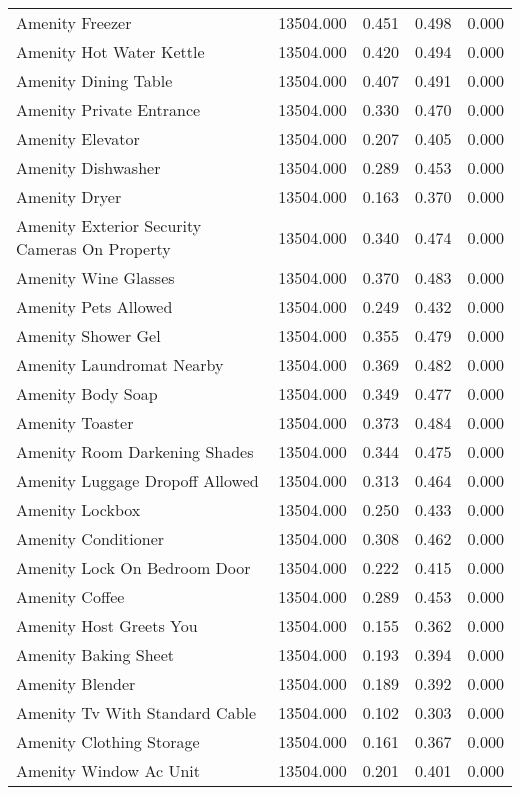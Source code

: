 \begin{tabular}{lllll}
Amenity Freezer & 13504.000 & 0.451 & 0.498 & 0.000 \\
Amenity Hot Water Kettle & 13504.000 & 0.420 & 0.494 & 0.000 \\
Amenity Dining Table & 13504.000 & 0.407 & 0.491 & 0.000 \\
Amenity Private Entrance & 13504.000 & 0.330 & 0.470 & 0.000 \\
Amenity Elevator & 13504.000 & 0.207 & 0.405 & 0.000 \\
Amenity Dishwasher & 13504.000 & 0.289 & 0.453 & 0.000 \\
Amenity Dryer & 13504.000 & 0.163 & 0.370 & 0.000 \\
Amenity Exterior Security Cameras On Property & 13504.000 & 0.340 & 0.474 & 0.000 \\
Amenity Wine Glasses & 13504.000 & 0.370 & 0.483 & 0.000 \\
Amenity Pets Allowed & 13504.000 & 0.249 & 0.432 & 0.000 \\
Amenity Shower Gel & 13504.000 & 0.355 & 0.479 & 0.000 \\
Amenity Laundromat Nearby & 13504.000 & 0.369 & 0.482 & 0.000 \\
Amenity Body Soap & 13504.000 & 0.349 & 0.477 & 0.000 \\
Amenity Toaster & 13504.000 & 0.373 & 0.484 & 0.000 \\
Amenity Room Darkening Shades & 13504.000 & 0.344 & 0.475 & 0.000 \\
Amenity Luggage Dropoff Allowed & 13504.000 & 0.313 & 0.464 & 0.000 \\
Amenity Lockbox & 13504.000 & 0.250 & 0.433 & 0.000 \\
Amenity Conditioner & 13504.000 & 0.308 & 0.462 & 0.000 \\
Amenity Lock On Bedroom Door & 13504.000 & 0.222 & 0.415 & 0.000 \\
Amenity Coffee & 13504.000 & 0.289 & 0.453 & 0.000 \\
Amenity Host Greets You & 13504.000 & 0.155 & 0.362 & 0.000 \\
Amenity Baking Sheet & 13504.000 & 0.193 & 0.394 & 0.000 \\
Amenity Blender & 13504.000 & 0.189 & 0.392 & 0.000 \\
Amenity Tv With Standard Cable & 13504.000 & 0.102 & 0.303 & 0.000 \\
Amenity Clothing Storage & 13504.000 & 0.161 & 0.367 & 0.000 \\
Amenity Window Ac Unit & 13504.000 & 0.201 & 0.401 & 0.000 \\

\end{tabular}
